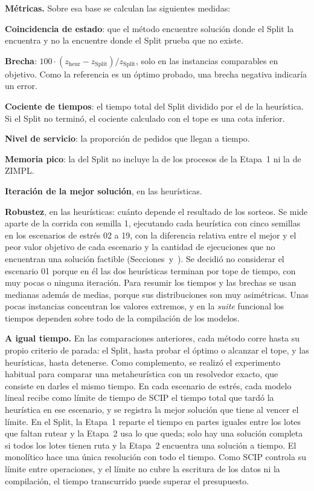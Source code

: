 {\bf Métricas.} Sobre esa base se calculan las siguientes medidas:
\startitemize
	\item {\bf Coincidencia de estado}: que el método encuentre solución
	donde el Split la encuentra y no la encuentre donde el Split prueba que
	no existe.
	\item {\bf Brecha}: $100 \cdot (z_{\text{heur}} - z_{\text{Split}}) / z_{\text{Split}}$,
	solo en las instancias comparables en objetivo. Como la referencia es un
	óptimo probado, una brecha negativa indicaría un error.
	\item {\bf Cociente de tiempos}: el tiempo total del Split dividido por el
	de la heurística. Si el Split no terminó, el cociente calculado con el
	tope es una cota inferior.
	\item {\bf Nivel de servicio}: la proporción de pedidos que llegan a tiempo.
	\item {\bf Memoria pico}: la del Split no incluye la de los procesos de la
	Etapa~1 ni la de ZIMPL.
	\item {\bf Iteración de la mejor solución}, en las heurísticas.
	\item {\bf Robustez}, en las heurísticas: cuánto depende el resultado de
	los sorteos. Se mide aparte de la corrida con semilla 1, ejecutando cada
	heurística con cinco semillas en los escenarios de estrés 02 a 19, con
	la diferencia relativa entre el mejor y el peor valor objetivo de cada
	escenario y la cantidad de ejecuciones que no encuentran una solución
	factible (Secciones~
	y~). Se decidió no considerar el escenario 01 porque en él las dos
	heurísticas terminan por tope de tiempo, con muy pocas o ninguna iteración.
\stopitemize
Para resumir los tiempos y las brechas se usan medianas además de medias,
porque sus distribuciones son muy asimétricas. Unas pocas instancias
concentran los valores extremos, y en la {\em suite} funcional los tiempos dependen
sobre todo de la compilación de los modelos.

{\bf A igual tiempo.} En las comparaciones anteriores, cada método corre
hasta su propio criterio de parada: el Split, hasta probar el óptimo o
alcanzar el tope, y las heurísticas, hasta detenerse. Como complemento, se
realizó el experimento habitual para comparar una metaheurística con un
resolvedor exacto, que consiste en darles el mismo tiempo. En cada escenario
de estrés, cada modelo lineal recibe como límite de tiempo de SCIP el tiempo
total que tardó la heurística en ese escenario, y se registra la mejor
solución que tiene al vencer el límite. En el Split, la Etapa~1 reparte el
tiempo en partes iguales entre los lotes que faltan rutear y la Etapa~2 usa
lo que queda; solo hay una solución completa si todos los lotes tienen ruta y
la Etapa~2 encuentra una solución a tiempo. El monolítico hace una única
resolución con todo el tiempo. Como SCIP controla su límite entre
operaciones, y el límite no cubre la escritura de los datos ni la
compilación, el tiempo transcurrido puede superar el presupuesto.

\stopsection
\stopchapter
